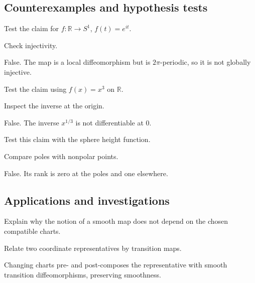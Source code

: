 \subsection*{Counterexamples and hypothesis tests}

\begin{exercise}\label{exr:vii03-ped-10}
Test the claim for \(f:\mathbb R\to S^1\), \(f(t)=e^{it}\).
\end{exercise}
\begin{hint}
Check injectivity.
\end{hint}
\begin{solution}
False.  The map is a local diffeomorphism but is \(2\pi\)-periodic, so it is not globally injective.
\end{solution}

\begin{exercise}\label{exr:vii03-ped-11}
Test the claim using \(f(x)=x^3\) on \(\mathbb R\).
\end{exercise}
\begin{hint}
Inspect the inverse at the origin.
\end{hint}
\begin{solution}
False.  The inverse \(x^{1/3}\) is not differentiable at \(0\).
\end{solution}

\begin{exercise}\label{exr:vii03-ped-12}
Test this claim with the sphere height function.
\end{exercise}
\begin{hint}
Compare poles with nonpolar points.
\end{hint}
\begin{solution}
False.  Its rank is zero at the poles and one elsewhere.
\end{solution}

\subsection*{Applications and investigations}

\begin{exercise}\label{exr:vii03-ped-13}
Explain why the notion of a smooth map does not depend on the chosen compatible charts.
\end{exercise}
\begin{hint}
Relate two coordinate representatives by transition maps.
\end{hint}
\begin{solution}
Changing charts pre- and post-composes the representative with smooth transition diffeomorphisms, preserving smoothness.
\end{solution}

